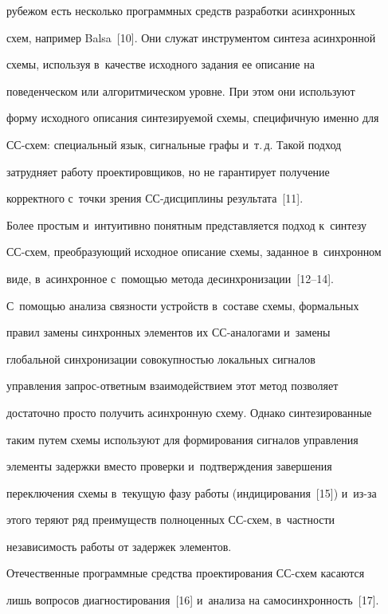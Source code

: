 рубежом есть несколько программных средств разработки асинхронных 

схем, например Balsa~[10]. Они служат инструментом синтеза асинхронной 

схемы, используя в~качестве исходного задания ее описание на 

поведенческом или алгоритмическом уровне. При этом они используют 

форму исходного описания син\-те\-зи\-ру\-емой схемы, специфичную именно для 

СС-схем: специальный язык, сигнальные графы и~т.\,д. Такой подход 

за\-труд\-ня\-ет работу проектировщиков, но не гарантирует получение 

корректного с~точ\-ки зрения СС-дис\-цип\-ли\-ны результата~[11].

  

  Более простым и~интуитивно понятным представляется подход к~синтезу 

\mbox{СС-схем}, преобразующий исходное описание схемы, заданное в~синхронном 

виде, в~асинхронное с~по\-мощью метода десинхронизации~[12--14].  

С~по\-мощью анализа связ\-ности устройств в~со\-ста\-ве схемы, формальных 

правил замены синхронных элементов их СС-ана\-ло\-га\-ми и~замены 

глобальной синхронизации со\-во\-куп\-ностью локальных сигналов  

управ\-ле\-ния за\-прос-от\-вет\-ным взаимодействием этот метод позволяет 

достаточно прос\-то получить асинхронную схему. Однако синтезированные 

таким путем схемы используют для формирования сигналов управ\-ле\-ния 

элементы за\-держ\-ки вмес\-то проверки и~под\-тверж\-де\-ния завершения 

переключения схемы в~текущую фазу работы (индицирования~[15]) и~из-за 

этого теряют ряд преимуществ полноценных СС-схем, в~част\-ности 

не\-за\-ви\-си\-мость работы от задержек элементов. 

  

  Отечественные программные средства проектирования СС-схем касаются 

лишь вопросов диагностирования~[16] и~анализа на са\-мо\-синхрон\-ность~[17]. 

